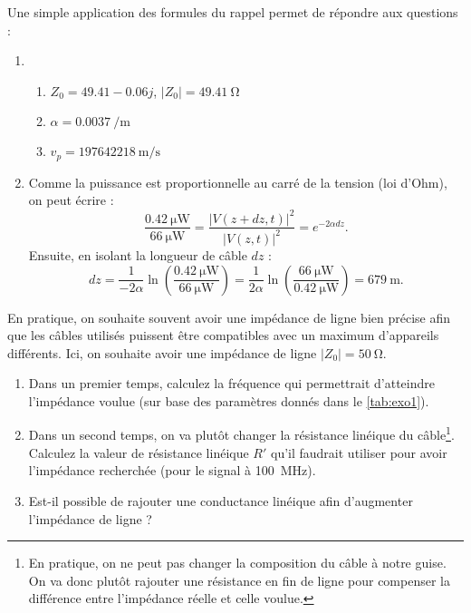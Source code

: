 \documentclass [a4paper, 11pt] {article}
\begin{document}
    \begin{reponse}
        Une simple application des formules du rappel permet de répondre aux questions :
        
        \begin{enumerate}
            \item \begin{enumerate}
                \item $Z_0=49.41-0.06j$, $|Z_0|=\SI{49.41}{\ohm}$
                \item $\alpha=\SI{0.0037}{\per\meter}$
                \item $v_p=\SI{197642218}{\meter\per\second}$
            \end{enumerate}
            \item Comme la puissance est proportionnelle au carré de la tension (loi d'Ohm), on peut écrire :
            \begin{equation}
                \frac{\SI{0.42}{\micro\watt}}{\SI{66}{\micro\watt}} = \frac{|V(z+dz,t)|^2}{|V(z,t)|^2} = e^{-2\alpha dz}.
            \end{equation}
            Ensuite, en isolant la longueur de câble $dz$ :
            \begin{equation}
                dz = \frac{1}{-2\alpha}\ln\left(\frac{\SI{0.42}{\micro\watt}}{\SI{66}{\micro\watt}}\right) = \frac{1}{2\alpha}\ln\left(\frac{\SI{66}{\micro\watt}}{\SI{0.42}{\micro\watt}}\right) = \SI{679}{\meter}.
            \end{equation}
        \end{enumerate}
    \end{reponse}
    
    \begin{exercice}{2}
        En pratique, on souhaite souvent avoir une impédance de ligne bien précise afin que les câbles utilisés puissent être compatibles avec un maximum d'appareils différents. Ici, on souhaite avoir une impédance de ligne $|Z_0|=\SI{50}{\ohm}$.
        
        \begin{enumerate}
            \item Dans un premier temps, calculez la fréquence qui permettrait d'atteindre l'impédance voulue (sur base des paramètres donnés dans le \autoref{tab:exo1}).
            \item Dans un second temps, on va plutôt changer la résistance linéique du câble\footnote{En pratique, on ne peut pas changer la composition du câble à notre guise. On va donc plutôt rajouter une résistance en fin de ligne pour compenser la différence entre l'impédance réelle et celle voulue.}. Calculez la valeur de résistance linéique $R'$ qu'il faudrait utiliser pour avoir l'impédance recherchée (pour le signal à \SI{100}{\mega\hertz}).
            \item Est-il possible de rajouter une conductance linéique afin d'augmenter l'impédance de ligne ?
        \end{enumerate}
    \end{exercice}
    
\end{document}
